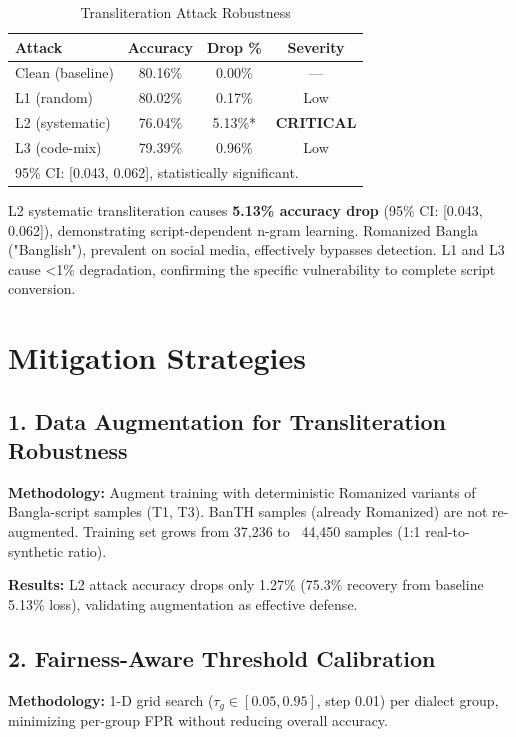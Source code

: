 \documentclass[conference]{IEEEtran}
\begin{document}
\begin{table}[h]
\centering
\caption{Transliteration Attack Robustness}
\label{tab:axisC}
\begin{tabular}{lccc}
\toprule
\textbf{Attack} & \textbf{Accuracy} & \textbf{Drop \%} & \textbf{Severity} \\
\midrule
Clean (baseline) & 80.16\% & 0.00\% & --- \\
L1 (random) & 80.02\% & 0.17\% & Low \\
L2 (systematic) & 76.04\% & 5.13\%* & \textbf{CRITICAL} \\
L3 (code-mix) & 79.39\% & 0.96\% & Low \\
\bottomrule
\multicolumn{4}{l}{\small *95\% CI: [0.043, 0.062], statistically significant.} \\
\end{tabular}
\end{table}

L2 systematic transliteration causes \textbf{5.13\% accuracy drop} (95\% CI: [0.043, 0.062]), demonstrating script-dependent n-gram learning. Romanized Bangla ("Banglish"), prevalent on social media, effectively bypasses detection. L1 and L3 cause <1\% degradation, confirming the specific vulnerability to complete script conversion.

\section{Mitigation Strategies}

\subsection{1. Data Augmentation for Transliteration Robustness}

\textbf{Methodology:} Augment training with deterministic Romanized variants of Bangla-script samples (T1, T3). BanTH samples (already Romanized) are not re-augmented. Training set grows from 37,236 to ~44,450 samples (1:1 real-to-synthetic ratio).

\textbf{Results:} L2 attack accuracy drops only 1.27\% (75.3\% recovery from baseline 5.13\% loss), validating augmentation as effective defense.

\subsection{2. Fairness-Aware Threshold Calibration}

\textbf{Methodology:} 1-D grid search ($\tau_g \in [0.05, 0.95]$, step 0.01) per dialect group, minimizing per-group FPR without reducing overall accuracy.
\end{document}
